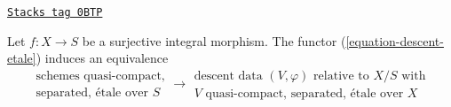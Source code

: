 \begin{proposition}[Effective]
\label{etale-proposition-effective}
\href{https://stacks.math.columbia.edu/tag/0BTP}{\texttt{Stacks tag 0BTP}}

Let $f : X \to S$ be a surjective integral morphism.
The functor (\ref{equation-descent-etale}) induces an equivalence
$$
\begin{matrix}
\text{schemes quasi-compact,}\\
\text{separated, \'etale over }S
\end{matrix}
\longrightarrow
\begin{matrix}
\text{descent data }(V, \varphi)\text{ relative to }X/S\text{ with}\\
V\text{ quasi-compact, separated, \'etale over }X
\end{matrix}
$$
\end{proposition}

